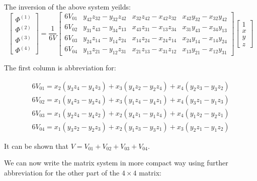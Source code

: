 \documentclass[en]{minipw} %
\begin{document}
The inversion of the above system yeilds:
\begin{equation}
\begin{bmatrix}
\Phi^{(1)} \\
\Phi^{(2)} \\
\Phi^{(3)} \\
\Phi^{(4)}
\end{bmatrix}
=
\dfrac{1}{6V}
\begin{bmatrix}
6V_{01} & y_{42}z_{32} - y_{32}z_{42} & x_{32}z_{42} - x_{42}z_{32} & x_{42}y_{32} - x_{32}y_{42} \\
6V_{02} & y_{31}z_{43} - y_{34}z_{13} & x_{43}z_{31} - x_{13}z_{34} & x_{31}y_{43} - x_{34}y_{13} \\
6V_{03} & y_{24}z_{14} - y_{14}z_{24} & x_{14}z_{24} - x_{24}z_{14} & x_{24}y_{14} - x_{14}y_{24} \\
6V_{04} & y_{13}z_{21} - y_{12}z_{31} & x_{21}z_{13} - x_{31}z_{12} & x_{13}y_{21} - x_{12}y_{31}
\end{bmatrix}
\begin{bmatrix}
1 \\
x \\
y \\
z
\end{bmatrix}
\end{equation}

The first column is abbreviation for:

\begin{equation}
\begin{aligned}
6V_{01} = x_2(y_3z_4 - y_4z_3) + x_3(y_4z_2 - y_2z_4) +x_4(y_2z_3 - y_3z_2)
\\
6V_{02} = x_1(y_4z_3 - y_3z_4) + x_3(y_1z_4 - y_4z_1) +x_4(y_3z_1 - y_1z_3)
\\
6V_{03} = x_1(y_2z_4 - y_4z_2) + x_2(y_4z_1 - y_1z_4) +x_4(y_1z_2 - y_2z_1)
\\
6V_{04} = x_1(y_3z_2 - y_2z_3) + x_2(y_1z_3 - y_3z_1) +x_3(y_2z_1 - y_1z_2)
\end{aligned}
\end{equation}

It can be shown that $V = V_{01} + V_{02} + V_{03} + V_{04}$.

We can now write the matrix system in more compact way using further abbreviation for the other part of the $4 \times 4$ matrix:
\end{document}
